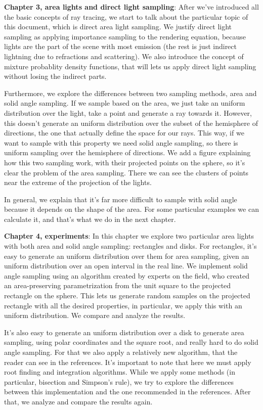 \documentclass{scrbook}
\begin{document}
\textbf{Chapter 3, area lights and direct light sampling}: After we've introduced all the basic concepts of ray tracing, we start to talk about the particular topic of this document, which is direct area light sampling. We justify direct light sampling as applying importance sampling to the rendering equation, because lights are the part of the scene with most emission (the rest is just indirect lightning due to refractions and scattering). We also introduce the concept of mixture probablity density functions, that will lets us apply direct light sampling without losing the indirect parts. 

Furthermore, we explore the differences between two sampling methods, area and solid angle sampling. If we sample based on the area, we just take an uniform distribution over the light, take a point and generate a ray towards it. However, this doesn't generate an uniform distribution over the subset of the hemisphere of directions, the one that actually define the space for our rays. This way, if we want to sample with this property we need solid angle sampling, so there is uniform sampling over the hemisphere of directions. We add a figure explaining how this two sampling work, with their projected points on the sphere, so it's clear the problem of the area sampling. There we can see the clusters of points near the extreme of the projection of the lights.


In general, we explain that it's far more difficult to sample with solid angle because it depends on the shape of the area. For some particular examples we can calculate it, and that's what we do in the next chapter.

\textbf{Chapter 4, experiments}: In this chapter we explore two particular area lights with both area and solid angle sampling: rectangles and disks. For rectangles, it's easy to generate an uniform distribution over them for area sampling, given an uniform distribution over an open interval in the real line. We implement solid angle sampling using an algorithm created by experts on the field, who created an area-preserving parametrization from the unit square to the projected rectangle on the sphere. This lets us generate random samples on the projected rectangle with all the desired properties, in particular, we apply this with an uniform distribution. We compare and analyze the results.

It's also easy to generate an uniform distribution over a disk to generate area sampling, using polar coordinates and the square root, and really hard to do solid angle sampling. For that we also apply a relatively new algorithm, that the reader can see in the references. It's important to note that here we must apply root finding and integration algorithms. While we apply some methods (in particular, bisection and Simpson's rule), we try to explore the differences between this implementation and the one recommended in the references. After that, we analyze and compare the results again.
\end{document}
